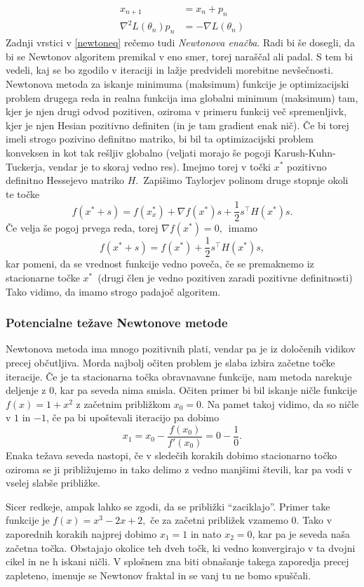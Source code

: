 \documentclass[12pt,a4paper]{amsart}
\theoremstyle{definition} %
\theoremstyle{plain} %
\begin{document}
\begin{align}\label{newtoneq}
    x_{n + 1} &= x_{n} + p_{n} \nonumber\\
    \nabla^2L(\theta_{n})p_{n} &= -\nabla L(\theta_{n})
\end{align}
Zadnji vrstici v \eqref{newtoneq} rečemo tudi \textit{Newtonova enačba}.
Radi bi še dosegli, da bi se Newtonov algoritem premikal v eno smer, torej naraščal ali padal. S tem bi vedeli, kaj se bo zgodilo v iteraciji in lažje predvideli morebitne
nevšečnosti. Newtonova metoda za iskanje minimuma (maksimum) funkcije je optimizacijski problem drugega reda in realna funkcija ima globalni minimum (maksimum) tam, kjer je
njen drugi odvod pozitiven, oziroma v primeru funkcij več spremenljivk, kjer je njen Hesian pozitivno definiten (in je tam gradient enak nič). Če bi torej imeli
strogo pozivino definitno matriko, bi bil ta optimizacijski problem konveksen in kot tak rešljiv globalno (veljati morajo še pogoji Karush-Kuhn-Tuckerja, vendar je to skoraj vedno res).
Imejmo torej v točki $x^{*}$ pozitivno definitno Hessejevo matriko $H.$~Zapišimo Taylorjev polinom druge stopnje okoli te točke
\[
    f(x^{*} + s) = f(x_x^{*}) + \nabla f(x^{*})s + \frac{1}{2}s^\top H(x^{*})s.
\]
Če velja še pogoj prvega reda, torej $\nabla f(x^{*}) = 0,$~imamo
\[
    f(x^{*} + s) = f(x^{*}) + \frac{1}{2}s^\top H(x^{*})s,
\]
kar pomeni, da se vrednost funkcije vedno poveča, če se premaknemo iz stacionarne točke $x^{*}$~(drugi člen je vedno pozitiven zaradi pozitivne definitnosti)
Tako vidimo, da imamo strogo padajoč algoritem.

\subsubsection{Potencialne težave Newtonove metode}
Newtonova metoda ima mnogo pozitivnih plati, vendar pa je iz določenih vidikov precej občutljiva. Morda najbolj očiten problem je slaba izbira začetne točke iteracije. Če je ta
stacionarna točka obravnavane funkcije, nam metoda narekuje deljenje z 0, kar pa seveda nima smisla. Očiten primer bi bil iskanje ničle funkcije $f(x) = 1+x^2$ z začetnim približkom $x_{0} = 0.$
Na pamet takoj vidimo, da so ničle v $1$ in $-1$, če pa bi upoštevali iteracijo pa dobimo
\[
    x_{1} = x_{0} - \frac{f(x_{0})}{f'(x_{0})} = 0 - \frac{1}{0}.   
\]
Enaka težava seveda nastopi, če v sledečih korakih dobimo stacionarno točko oziroma se ji približujemo in tako delimo z vedno manjšimi števili, kar pa vodi v vselej slabše približke.

Sicer redkeje, ampak lahko se zgodi, da se približki "`zaciklajo"'. Primer take funkcije je $f(x) = x^3 - 2x + 2,$ če za začetni približek vzamemo 0. Tako v zaporednih korakih najprej dobimo
$x_{1} = 1$ in nato $x_{2} = 0$, kar pa je seveda naša začetna točka. Obstajajo okolice teh dveh točk, ki vedno konvergirajo v ta dvojni cikel in ne h iskani ničli. V splošnem 
zna biti obnašanje takega zaporedja precej zapleteno, imenuje se Newtonov fraktal in se vanj tu ne bomo spuščali.
\end{document}
